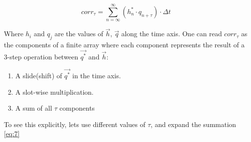 \vspace{0.5cm}

\begin{equation}\label{eq:7}
corr_{\tau} = \sum_{n=\infty}^{\infty} (h^*_{n} \cdot q_{n+\tau}) \cdot \Delta t
\end{equation}


Where $h_i$ and $q_j$  are the values of $\vec{h}$, $\vec{q}$ along the time axis. One can read $corr_\tau$ as the components of a finite array where each component represents  the result of a 3-step operation between $\vec{q^*}$ and $\vec{h}$:

\begin{enumerate}
\item A slide(shift) of $\vec{q^*}$ in the time axis.
\item A slot-wise multiplication.
\item A sum of all $\tau$ components
\end{enumerate}

To see this explicitly, lets use different values of $\tau$, and expand the summation \ref{eq:7} 

